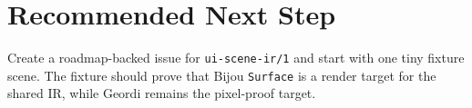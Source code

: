 \section{Recommended Next Step}\label{record-138-recommended-next-step}

Create a roadmap-backed issue for \texttt{u\allowbreak{}i\allowbreak{}-\allowbreak{}s\allowbreak{}c\allowbreak{}e\allowbreak{}n\allowbreak{}e\allowbreak{}-\allowbreak{}i\allowbreak{}r\allowbreak{}/\allowbreak{}1} and start with one tiny fixture scene. The fixture should prove that Bijou \texttt{S\allowbreak{}u\allowbreak{}r\allowbreak{}f\allowbreak{}a\allowbreak{}c\allowbreak{}e} is a render target for the shared IR, while Geordi remains the pixel-proof target.

